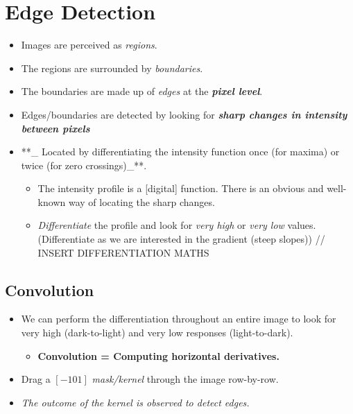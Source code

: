 \documentclass[english, 10pt]{article}
\begin{document}
\section{Edge Detection}\label{edge-detection}

\begin{itemize}
\item
  Images are perceived as \emph{regions}.
\item
  The regions are surrounded by \emph{boundaries}.
\item
  The boundaries are made up of \emph{edges} at the \textbf{\emph{pixel
  level}}.
\item
  Edges/boundaries are detected by looking for \textbf{\emph{sharp
  changes in \emph{intensity} between pixels}}
\item
  **\_ Located by differentiating the intensity function once (for
  maxima) or twice (for zero crossings)\_**.

  \begin{itemize}
  \itemsep1pt\parskip0pt
  \item
    The intensity profile is a {[}digital{]} function. There is an
    obvious and well-known way of locating the sharp changes.
  \item
    \emph{Differentiate} the profile and look for \emph{very high} or
    \emph{very low} values. (Differentiate as we are interested in the
    gradient (steep slopes)) // INSERT DIFFERENTIATION MATHS
  \end{itemize}
\end{itemize}

\subsection{Convolution}\label{convolution}

\begin{itemize}
\itemsep1pt\parskip0pt
\item
  We can perform the differentiation throughout an entire image to look
  for very high (dark-to-light) and very low responses (light-to-dark).

  \begin{itemize}
  \itemsep1pt\parskip0pt
  \item
    \textbf{Convolution = Computing horizontal derivatives.}
  \end{itemize}
\item
  Drag a $[-1 0 1]$ \emph{mask/kernel} through the image row-by-row.
\item
  \emph{The outcome of the kernel is observed to detect edges.}
\end{itemize}
\end{document}
